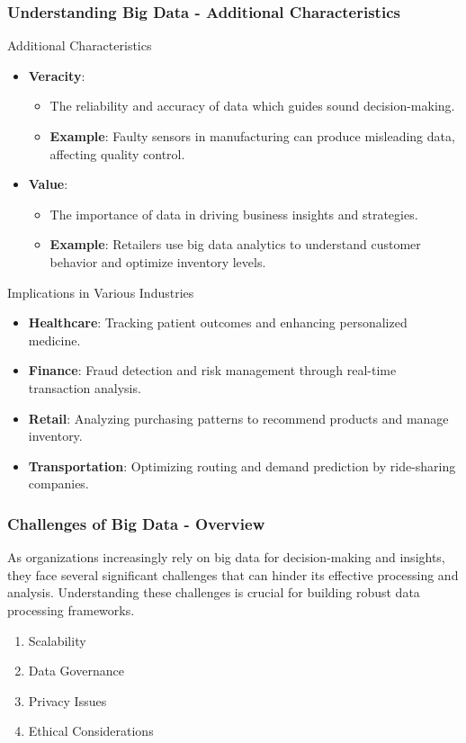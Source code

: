 \documentclass[aspectratio=169]{beamer}
\begin{document}
\begin{frame}[fragile]
    \frametitle{Understanding Big Data - Additional Characteristics}
    \begin{block}{Additional Characteristics}
        \begin{itemize}
            \item \textbf{Veracity}:
                \begin{itemize}
                    \item The reliability and accuracy of data which guides sound decision-making.
                    \item \textbf{Example}: Faulty sensors in manufacturing can produce misleading data, affecting quality control.
                \end{itemize}
            \item \textbf{Value}:
                \begin{itemize}
                    \item The importance of data in driving business insights and strategies.
                    \item \textbf{Example}: Retailers use big data analytics to understand customer behavior and optimize inventory levels.
                \end{itemize}
        \end{itemize}
    \end{block}
    
    \begin{block}{Implications in Various Industries}
        \begin{itemize}
            \item \textbf{Healthcare}: Tracking patient outcomes and enhancing personalized medicine.
            \item \textbf{Finance}: Fraud detection and risk management through real-time transaction analysis.
            \item \textbf{Retail}: Analyzing purchasing patterns to recommend products and manage inventory.
            \item \textbf{Transportation}: Optimizing routing and demand prediction by ride-sharing companies.
        \end{itemize}
    \end{block}
\end{frame}

\begin{frame}[fragile]
    \frametitle{Challenges of Big Data - Overview}
    As organizations increasingly rely on big data for decision-making and insights, they face several significant challenges that can hinder its effective processing and analysis. Understanding these challenges is crucial for building robust data processing frameworks.
    
    \begin{enumerate}
        \item Scalability
        \item Data Governance
        \item Privacy Issues
        \item Ethical Considerations
    \end{enumerate}
\end{frame}
\end{document}
